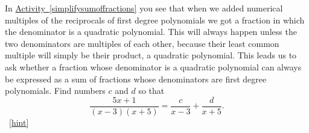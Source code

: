 \documentclass{book}
\begin{document}
\setcounter{project}{264}
\addtocounter{project}{-1}
\begin{activity}[]\label{partialfractionsintro}
\hypertarget{p-1397}{}%
In \hyperref[simplifysumoffractions]{Activity~\ref{simplifysumoffractions}} you see that when we added numerical multiples of the reciprocals of first degree polynomials we got a fraction in which the denominator is a quadratic polynomial. This will always happen unless the two denominators are multiples of each other, because their least common multiple will simply be their product, a quadratic polynomial. This leads us to ask whether a fraction whose denominator is a quadratic polynomial can always be expressed as a sum of fractions whose denominators are first degree polynomials. Find numbers \(c\) and \(d\) so that%
\begin{equation*}
\frac{5x+1}{(x-3)(x+5)} = \frac{c}{x-3} + \frac{d}{x+5}.
\end{equation*}
%
~\hfill{\tiny\hyperlink{a-264}{[hint]}\hypertarget{q-264}{}}\end{activity}
\end{document}
